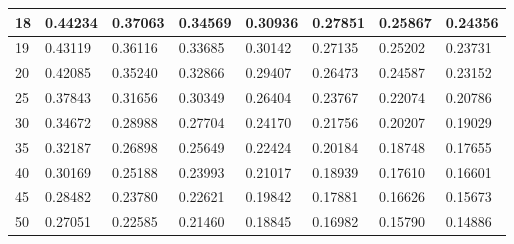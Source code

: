 \documentclass[11pt]{article}
\begin{document}
\begin{appendices}
\begin{table}[]
\begin{tabular}{|l|l|l|l|l|l|l|l|}
18 & 0.44234 & 0.37063 & 0.34569 & 0.30936 & 0.27851 & 0.25867 & 0.24356 \\ \hline
19 & 0.43119 & 0.36116 & 0.33685 & 0.30142 & 0.27135 & 0.25202 & 0.23731 \\ \hline
20 & 0.42085 & 0.35240 & 0.32866 & 0.29407 & 0.26473 & 0.24587 & 0.23152 \\ \hline
25 & 0.37843 & 0.31656 & 0.30349 & 0.26404 & 0.23767 & 0.22074 & 0.20786 \\ \hline
30 & 0.34672 & 0.28988 & 0.27704 & 0.24170 & 0.21756 & 0.20207 & 0.19029 \\ \hline
35 & 0.32187 & 0.26898 & 0.25649 & 0.22424 & 0.20184 & 0.18748 & 0.17655 \\ \hline
40 & 0.30169 & 0.25188 & 0.23993 & 0.21017 & 0.18939 & 0.17610 & 0.16601 \\ \hline
45 & 0.28482 & 0.23780 & 0.22621 & 0.19842 & 0.17881 & 0.16626 & 0.15673 \\ \hline
50 & 0.27051 & 0.22585 & 0.21460 & 0.18845 & 0.16982 & 0.15790 & 0.14886 \\ \hline
\end{tabular}
\end{table}
\end{appendices}
\end{document}
